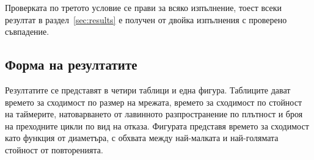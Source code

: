 Проверката по третото условие се прави за всяко изпълнение, тоест всеки резултат в
раздел~\ref{sec:results} е получен от двойка изпълнения с проверено съвпадение.

\subsection{Форма на резултатите}

Резултатите се представят в четири таблици и една фигура. Таблиците дават времето за
сходимост по размер на мрежата, времето за сходимост по стойност на таймерите, натоварването
от лавинното разпространение по плътност и броя на преходните цикли по вид на отказа.
Фигурата представя времето за сходимост като функция от диаметъра, с обхвата между
най-малката и най-голямата стойност от повторенията.
